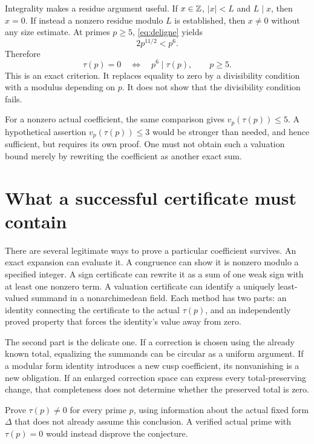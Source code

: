 Integrality makes a residue argument useful. If $x\in\mathbb Z$, $|x|<L$ and $L\mid x$, then $x=0$. If instead a nonzero residue modulo $L$ is established, then $x\ne0$ without any size estimate. At primes $p\ge5$, \eqref{eq:deligne} yields
\[
2p^{11/2}<p^6.
\]
Therefore
\begin{equation}\label{eq:p6}
\tau(p)=0\quad\Longleftrightarrow\quad p^6\mid\tau(p),\qquad p\ge5.
\end{equation}
This is an exact criterion. It replaces equality to zero by a divisibility condition with a modulus depending on $p$. It does not show that the divisibility condition fails.

For a nonzero actual coefficient, the same comparison gives $v_p(\tau(p))\le5$. A hypothetical assertion $v_p(\tau(p))\le3$ would be stronger than needed, and hence sufficient, but requires its own proof. One must not obtain such a valuation bound merely by rewriting the coefficient as another exact sum.

\section{What a successful certificate must contain}
There are several legitimate ways to prove a particular coefficient survives. An exact expansion can evaluate it. A congruence can show it is nonzero modulo a specified integer. A sign certificate can rewrite it as a sum of one weak sign with at least one nonzero term. A valuation certificate can identify a uniquely least-valued summand in a nonarchimedean field. Each method has two parts: an identity connecting the certificate to the actual $\tau(p)$, and an independently proved property that forces the identity's value away from zero.

The second part is the delicate one. If a correction is chosen using the already known total, equalizing the summands can be circular as a uniform argument. If a modular form identity introduces a new cusp coefficient, its nonvanishing is a new obligation. If an enlarged correction space can express every total-preserving change, that completeness does not determine whether the preserved total is zero.

\begin{openproblem}
Prove $\tau(p)\ne0$ for every prime $p$, using information about the actual fixed form $\Delta$ that does not already assume this conclusion. A verified actual prime with $\tau(p)=0$ would instead disprove the conjecture.
\end{openproblem}

